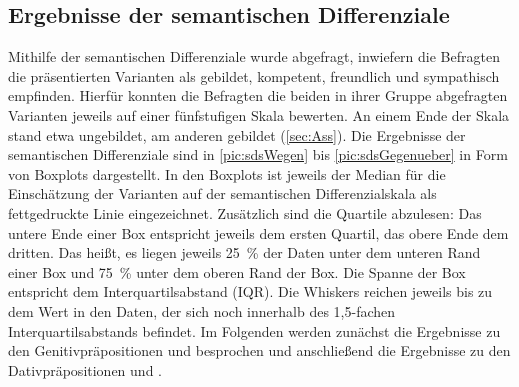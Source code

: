 \subsection{Ergebnisse der semantischen Differenziale}
\label{sec:ErgSemDiff}
Mithilfe der semantischen Differenziale wurde abgefragt, inwiefern die Befragten die präsentierten Varianten als gebildet, kompetent, freundlich und sympathisch empfinden. 
Hierfür konnten die Befragten die beiden in ihrer Gruppe abgefragten Varianten jeweils auf einer fünfstufigen Skala bewerten. 
An einem Ende der Skala stand etwa \glqq ungebildet\grqq, am anderen \glqq gebildet\grqq{} (\autoref{sec:Ass}). 
Die Ergebnisse der semantischen Differenziale sind in \autoref{pic:sdsWegen} bis \autoref{pic:sdsGegenueber} in Form von Boxplots dargestellt.
In den Boxplots ist jeweils der Median für die Einschätzung der Varianten auf der semantischen Differenzialskala als fettgedruckte Linie eingezeichnet. 
Zusätzlich sind die Quartile abzulesen: Das untere Ende einer Box entspricht jeweils dem ersten Quartil, das obere Ende dem dritten. 
Das heißt, es liegen jeweils 25~\% der Daten unter dem unteren Rand einer Box und 75~\% unter dem oberen Rand der Box.
Die Spanne der Box entspricht dem Interquartilsabstand (IQR). 
Die Whiskers reichen jeweils bis zu dem Wert in den Daten, der sich noch innerhalb des 1,5-fachen Interquartilsabstands befindet.
Im Folgenden werden zunächst die Ergebnisse zu den Genitivpräpositionen \wegen{} und \waehrend{} besprochen und anschließend die Ergebnisse zu den Dativpräpositionen \dank{} und \gegenueber. 

